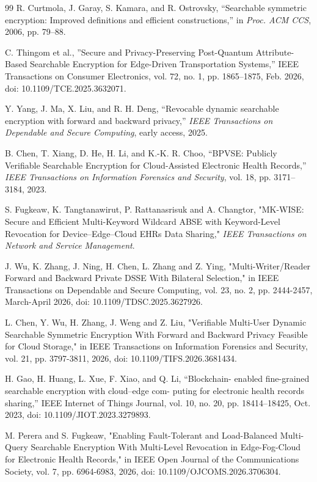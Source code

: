\documentclass{ieeetj}
\theoremstyle{ieee-style}
\begin{document}
\begin{thebibliography}{99}
R. Curtmola, J. Garay, S. Kamara, and R. Ostrovsky, “Searchable symmetric encryption: Improved definitions and efficient constructions,” in \emph{Proc. ACM CCS}, 2006, pp. 79–88.

C. Thingom et al., ”Secure and Privacy-Preserving Post-Quantum
Attribute-Based Searchable Encryption for Edge-Driven Transportation
Systems,” IEEE Transactions on Consumer Electronics, vol. 72, no. 1,
pp. 1865–1875, Feb. 2026, doi: 10.1109/TCE.2025.3632071.

Y. Yang, J. Ma, X. Liu, and R. H. Deng, “Revocable dynamic searchable encryption with forward and backward privacy,” \emph{IEEE Transactions on Dependable and Secure Computing}, early access, 2025.

B. Chen, T. Xiang, D. He, H. Li, and K.-K. R. Choo, “BPVSE: Publicly Verifiable Searchable Encryption for Cloud-Assisted Electronic Health Records,” \emph{IEEE Transactions on Information Forensics and Security}, vol. 18, pp. 3171–3184, 2023.

S. Fugkeaw, K. Tangtanawirut, P. Rattanasrisuk and A. Changtor, "MK-WISE: Secure and Efficient Multi-Keyword Wildcard ABSE with Keyword-Level Revocation for Device–Edge–Cloud EHRs Data Sharing," \emph {IEEE Transactions on Network and Service Management}.

J. Wu, K. Zhang, J. Ning, H. Chen, L. Zhang and Z. Ying, "Multi-Writer/Reader Forward and Backward Private DSSE With Bilateral Selection," in IEEE Transactions on Dependable and Secure Computing, vol. 23, no. 2, pp. 2444-2457, March-April 2026, doi: 10.1109/TDSC.2025.3627926.

L. Chen, Y. Wu, H. Zhang, J. Weng and Z. Liu, "Verifiable Multi-User Dynamic Searchable Symmetric Encryption With Forward and Backward Privacy Feasible for Cloud Storage," in IEEE Transactions on Information Forensics and Security, vol. 21, pp. 3797-3811, 2026, doi: 10.1109/TIFS.2026.3681434.

H. Gao, H. Huang, L. Xue, F. Xiao, and Q. Li, “Blockchain-
enabled fine-grained searchable encryption with cloud–edge com-
puting for electronic health records sharing,” IEEE Internet of
Things Journal, vol. 10, no. 20, pp. 18414–18425, Oct. 2023, doi:
10.1109/JIOT.2023.3279893.

M. Perera and S. Fugkeaw, "Enabling Fault-Tolerant and Load-Balanced Multi-Query Searchable Encryption With Multi-Level Revocation in Edge-Fog-Cloud for Electronic Health Records," in IEEE Open Journal of the Communications Society, vol. 7, pp. 6964-6983, 2026, doi: 10.1109/OJCOMS.2026.3706304. 


\end{thebibliography}
\end{document}
